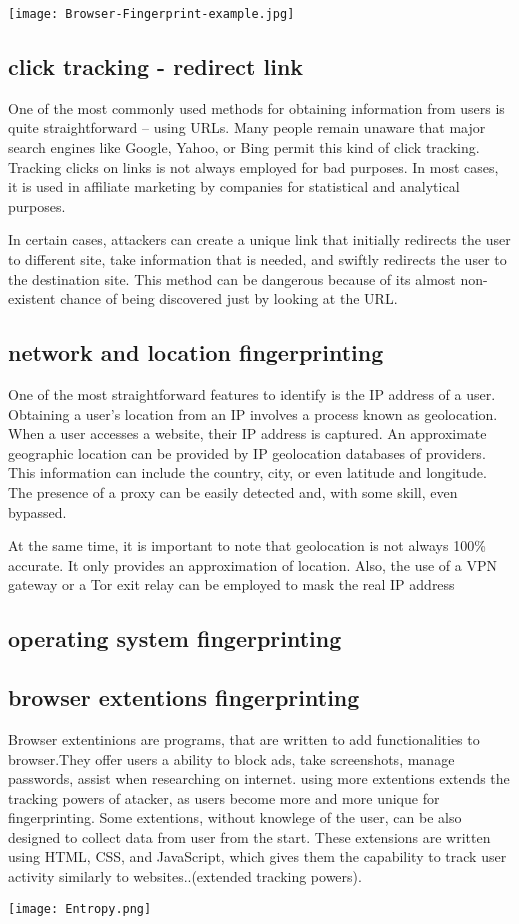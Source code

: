 \documentclass[10pt,a4paper,column]{article}
\begin{document}
\begin{center}
\texttt{[image: Browser-Fingerprint-example.jpg]}
\end{center}
\subsection{click tracking - redirect link} 
One of the most commonly used methods for obtaining information from users is quite straightforward – using URLs. Many people remain unaware that major search engines like Google, Yahoo, or Bing permit this kind of click tracking. Tracking clicks on links is not always employed for bad purposes. In most cases, it is used in affiliate marketing by companies for statistical and analytical purposes. 

In certain cases, attackers can create a unique link that initially redirects the user to different site, take information that is needed, and swiftly redirects the user to the destination site. This method can be dangerous because of its almost non-existent chance of being discovered just by looking at the URL. 
\subsection{network and location fingerprinting}
One of the most straightforward features to identify is the IP address of a user. Obtaining a user's location from an IP involves a process known as geolocation. When a user accesses a website, their IP address is captured. An approximate geographic location can be provided by IP geolocation databases of providers. This information can include the country, city, or even latitude and longitude. The presence of a proxy can be easily detected and, with some skill, even bypassed.

At the same time, it is important to note that geolocation is not always 100\% accurate. It only provides an approximation of location. Also, the use of a VPN gateway or a Tor exit relay can be employed to mask the real IP address

\subsection{operating system fingerprinting}
\subsection{browser extentions fingerprinting}
Browser extentinions are programs, that are written to add functionalities to browser.They offer users a ability to block ads, take screenshots, manage passwords, assist when researching on internet. using more extentions extends the tracking powers of atacker, as  users become more and more unique for fingerprinting. Some extentions, without knowlege of the user, can be also designed to collect data from user from the start. These extensions are written using HTML, CSS, and JavaScript, which gives them the capability to track user activity similarly to websites..(extended tracking powers).
\begin{center}
\texttt{[image: Entropy.png]}
\end{center}
\end{document}
